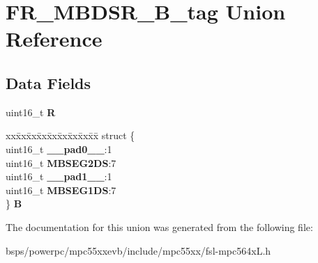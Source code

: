 \hypertarget{unionFR__MBDSR__16B__tag}{}\section{F\+R\+\_\+\+M\+B\+D\+S\+R\+\_\+B\+\_\+tag Union Reference}
\label{unionFR__MBDSR__16B__tag}
\subsection*{Data Fields}
\begin{DoxyCompactItemize}
\item 
\mbox{\label{unionFR__MBDSR__16B__tag_aff0902ede24394bb1cf3397a17b0eada}} 
uint16\+\_\+t {\bfseries R}
\item 
\mbox{\label{unionFR__MBDSR__16B__tag_a4f9daeeb7c1448edbf639341ffe1948b}} 
\begin{tabbing}
xx\=xx\=xx\=xx\=xx\=xx\=xx\=xx\=xx\=\kill
struct \{\\
\>uint16\_t {\bfseries \_\_pad0\_\_}:1\\
\>uint16\_t {\bfseries MBSEG2DS}:7\\
\>uint16\_t {\bfseries \_\_pad1\_\_}:1\\
\>uint16\_t {\bfseries MBSEG1DS}:7\\
\} {\bfseries B}\\

\end{tabbing}\end{DoxyCompactItemize}


The documentation for this union was generated from the following file\+:\begin{DoxyCompactItemize}
\item 
bsps/powerpc/mpc55xxevb/include/mpc55xx/fsl-\/mpc564x\+L.\+h\end{DoxyCompactItemize}
